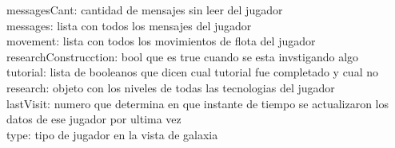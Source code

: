 \documentclass{article}
\newcommand\tab[1][1cm]{\hspace*{#1}}
\begin{document}
            \tab messagesCant: cantidad de mensajes sin leer del jugador\\
            \tab messages: lista con todos los mensajes del jugador\\
            \tab movement: lista con todos los movimientos de flota del jugador\\
            \tab researchConstrucction: bool que es true cuando se esta invstigando algo\\
            \tab tutorial: lista de booleanos que dicen cual tutorial fue completado y cual no\\
            \tab research: objeto con los niveles de todas las tecnologias del jugador\\
            \tab lastVisit: numero que determina en que instante de tiempo se actualizaron los datos de ese jugador por ultima vez\\
            \tab type: tipo de jugador en la vista de galaxia\\
\end{document}
